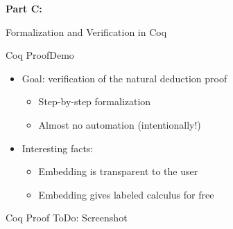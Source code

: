 \begin{transitionframe}
\textbf{Part C:}

Formalization and Verification in Coq
\end{transitionframe}

\begin{frame}{Coq Proof}{Demo}
\begin{itemize}
\item \begin{LARGE} Goal: verification of the natural deduction proof \end{LARGE}
\begin{itemize}
\item \begin{large} Step-by-step formalization \end{large}
\pause
\item \begin{large} Almost no automation (intentionally!) \end{large}
\end{itemize}
%
\pause
\item \begin{LARGE} Interesting facts: \end{LARGE}
\begin{itemize}
\item \begin{large} Embedding is transparent to the user \end{large}
\pause
\item \begin{large} Embedding gives labeled calculus for free \end{large}
\end{itemize}
\end{itemize}
\end{frame}

\begin{frame}{Coq Proof}
ToDo: Screenshot
\end{frame}
